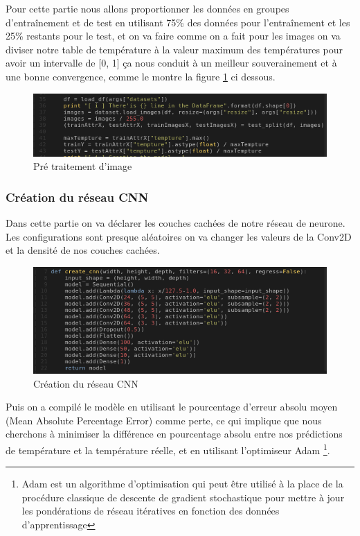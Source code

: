 \documentclass[12pt]{article}
\begin{document}
Pour cette partie nous allons proportionner les données en groupes d’entraînement et de test en utilisant 75\% des données pour l’entraînement et les 25\% restants pour le test, et on va faire comme on a fait pour les images on va diviser notre table de température à la valeur maximum des températures pour avoir un intervalle de [0, 1] ça nous conduit à un meilleur souverainement et à une bonne convergence, comme le montre la figure \ref{fig:73} ci dessous.

\begin{figure}[h]
	\centering
	\includegraphics[width=15cm]{img-Chapiter-4/pretraitementimage.png}
	\caption{Pré traitement d'image}
	\label{fig:73}
\end{figure}

\subsubsection*{Création du réseau CNN}
Dans cette partie on va déclarer les couches cachées de notre réseau de neurone. Les configurations sont presque aléatoires on va changer les valeurs de la Conv2D et la densité de nos couches cachées.

\begin{figure}[h]
	\centering
	\includegraphics[width=15cm]{img-Chapiter-4/createcnn.png}
	\caption{Création du réseau CNN}
\end{figure}

Puis on a compilé le modèle en utilisant le pourcentage d'erreur absolu moyen (Mean Absolute Percentage Error) comme perte, ce qui implique que nous cherchons à minimiser la différence en pourcentage absolu entre nos prédictions de température et la température réelle, et en utilisant l'optimiseur Adam \footnote{Adam est un algorithme d'optimisation qui peut être utilisé à la place de la procédure classique de descente de gradient stochastique pour mettre à jour les pondérations de réseau itératives en fonction des données d'apprentissage}.
\end{document}
